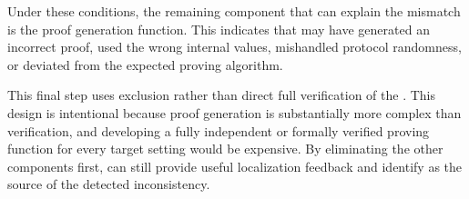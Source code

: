 Under these conditions, the remaining component that can explain the mismatch is the proof generation function. This indicates that \pfunc may have generated an incorrect proof, used the wrong internal values, mishandled protocol randomness, or deviated from the expected proving algorithm.

This final step uses exclusion rather than direct full verification of the \pfunc. This design is intentional because proof generation is substantially more complex than verification, and developing a fully independent or formally verified proving function for every target setting would be expensive. By eliminating the other components first, \greyboxfuzz can still provide useful localization feedback and identify \pfunc as the source of the detected inconsistency.